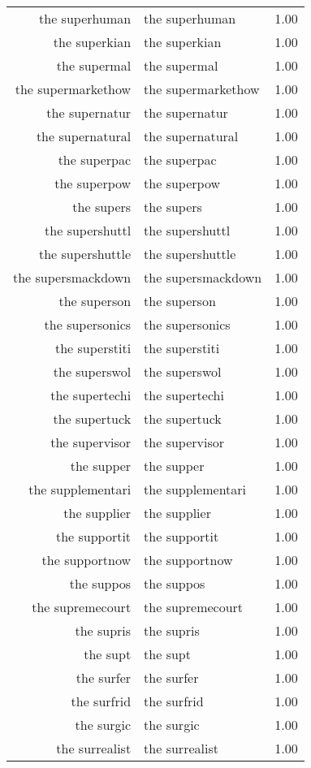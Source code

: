 \begin{table}[ht]
\begin{tabular}{rlr}
  the superhuman & the superhuman & 1.00 \\ 
  the superkian & the superkian & 1.00 \\ 
  the supermal & the supermal & 1.00 \\ 
  the supermarkethow & the supermarkethow & 1.00 \\ 
  the supernatur & the supernatur & 1.00 \\ 
  the supernatural & the supernatural & 1.00 \\ 
  the superpac & the superpac & 1.00 \\ 
  the superpow & the superpow & 1.00 \\ 
  the supers & the supers & 1.00 \\ 
  the supershuttl & the supershuttl & 1.00 \\ 
  the supershuttle & the supershuttle & 1.00 \\ 
  the supersmackdown & the supersmackdown & 1.00 \\ 
  the superson & the superson & 1.00 \\ 
  the supersonics & the supersonics & 1.00 \\ 
  the superstiti & the superstiti & 1.00 \\ 
  the superswol & the superswol & 1.00 \\ 
  the supertechi & the supertechi & 1.00 \\ 
  the supertuck & the supertuck & 1.00 \\ 
  the supervisor & the supervisor & 1.00 \\ 
  the supper & the supper & 1.00 \\ 
  the supplementari & the supplementari & 1.00 \\ 
  the supplier & the supplier & 1.00 \\ 
  the supportit & the supportit & 1.00 \\ 
  the supportnow & the supportnow & 1.00 \\ 
  the suppos & the suppos & 1.00 \\ 
  the supremecourt & the supremecourt & 1.00 \\ 
  the supris & the supris & 1.00 \\ 
  the supt & the supt & 1.00 \\ 
  the surfer & the surfer & 1.00 \\ 
  the surfrid & the surfrid & 1.00 \\ 
  the surgic & the surgic & 1.00 \\ 
  the surrealist & the surrealist & 1.00 \\ 

\end{tabular}
\end{table}
